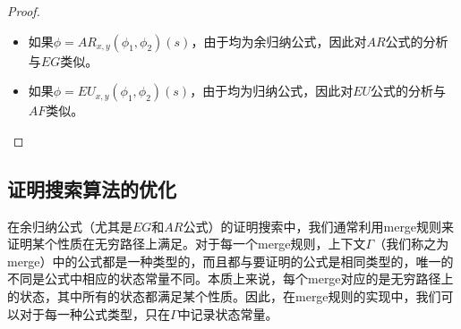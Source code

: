 \begin{proof}
\begin{itemize}
\begin{itemize}
\begin{itemize}
				$\textsf{cpt}(\Gamma\vdash EG_x(\psi)(s), c_1, c_2) \rsa^*\\
				\textsf{cpt}(\vdash(s/x)\psi,
				\textsf{cpt}(\Gamma'\vdash EG_x(\psi)(s_1), c_1,\\
				\textsf{cpt}(...\textsf{cpt}( \Gamma'\vdash EG_x(\psi)(s_n), c_1, c_2)...)),\\
				c_2)\rsa^*\\
				\textsf{cpt}(\Gamma'\vdash EG_x(\psi)(s_1), c_1,
				\textsf{cpt}(...\textsf{cpt}(\Gamma'\vdash EG_x(\psi)(s_n), c_1, c_2)...))\rsa^*\\
				\ldots\rsa^*\\
				\textsf{cpt}(\Gamma'\vdash EG_x(\psi)(s_i), c_1,
				\textsf{cpt}(...\textsf{cpt}(\Gamma'\vdash EG_x(\psi)(s_n), c_1, c_2)...))\rsa^*c_1$。
			\end{itemize}
		\end{itemize}
		
		\item 如果$\phi = AR_{x,y}(\phi_1,\phi_2)(s)$，由于均为余归纳公式，因此对$AR$公式的分析与$EG$类似。
		\item 如果$\phi = EU_{x,y}(\phi_1,\phi_2)(s)$，由于均为归纳公式，因此对$EU$公式的分析与$AF$类似。
	\end{itemize}
	
\end{proof}

\subsection{证明搜索算法的优化}\label{subsec:proofsearch:optimize}
在余归纳公式（尤其是$EG$和$AR$公式）的证明搜索中，我们通常利用merge规则来证明某个性质在无穷路径上满足。对于每一个merge规则，上下文$\Gamma$（我们称之为merge）中的公式都是一种类型的，而且都与要证明的公式是相同类型的，唯一的不同是公式中相应的状态常量不同。本质上来说，每个merge对应的是无穷路径上的状态，其中所有的状态都满足某个性质。因此，在merge规则的实现中，我们可以对于每一种公式类型，只在$\Gamma$中记录状态常量。

